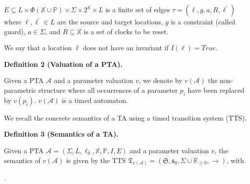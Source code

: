 \documentclass[10pt,a4paper]{article}
\begin{document}
$E\subseteq L\times\Phi(\mathbb{X}\cup\mathbb{P})\times\Sigma\times 2^{\mathbb{X}}\times L$ is a finite set of edges $\tau=(\mathrm{\ell},g,a,R,\mathrm{\ell}^{\prime})$ where $\mathrm{\ell},\mathrm{\ell}^{\prime}\in L$ are the source and target locations, $g$ is a constraint (called guard), $a\in\Sigma$, and $R\subseteq\mathbb{X}$ is a set of clocks to be reset.\par
 
 
  
We say that a location $\mathrm{\ell}$ does not have an invariant if $I(\mathrm{\ell})=\mathit{True}$.\par
 
 
 
 
\par\medskip\noindent\textbf{Definition 2 (Valuation of a PTA).}\par
 
 
Given a PTA $\mathcal{A}$ and a parameter valuation $v$, we denote by $v(\mathcal{A})$ the non-parametric structure where all occurrences of a parameter $p_{i}$ have been replaced by $v(p_{i})$. $v(\mathcal{A})$ is a timed automaton.\par
 
 
 
 
We recall the concrete semantics of a TA using a timed transition system (TTS).\par
 
 
 
\par\medskip\noindent\textbf{Definition 3 (Semantics of a TA).}\par
 
 
Given a PTA $\mathcal{A}=(\Sigma,L,\mathrm{\mathrm{\ell}_{0}},\mathbb{X},\mathbb{P},I,E)$ and a parameter valuation $v$, the semantics of $v(\mathcal{A})$ is given by the TTS $\mathfrak{T}_{v(\mathcal{A})}=(\mathfrak{S},\mathfrak{s}_{0},\Sigma\cup\mathbb{R}_{\geq 0},{\rightarrow})$, with\par
  
\par{}. 
 
\end{document}

